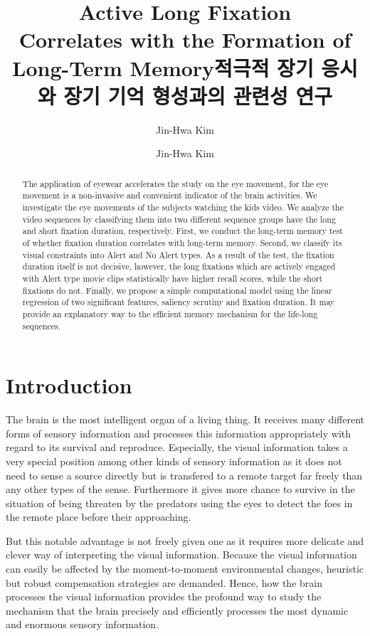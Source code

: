 \documentclass[oneside,master]{snueethesis}
\title{Active Long Fixation \\
Correlates with the Formation of \\
Long-Term Memory}
\title*{적극적 장기 응시와 장기 기억 형성과의 관련성 연구}
\author{Jin-Hwa Kim}
\author*{Jin-Hwa Kim} %
\begin{document}
\makefrontcover
\makefrontcover
\makeapproval

\cleardoublepage
{}

\begin{abstract}
The application of eyewear accelerates the study on the eye movement, for the eye movement is a non-invasive and convenient indicator of the brain activities. We investigate the eye movements of the subjects watching the kids video. We analyze the video sequences by classifying them into two different sequence groups have the long and short fixation duration, respectively. First, we conduct the long-term memory test of whether fixation duration correlates with long-term memory. Second, we classify its visual constraints into Alert and No Alert types. As a result of the test, the fixation duration itself is not decisive, however, the long fixations which are actively engaged with Alert type movie clips statistically have higher recall scores, while the short fixations do not. Finally, we propose a simple computational model using the linear regression of two significant features, saliency scrutiny and fixation duration. It may provide an explanatory way to the efficient memory mechanism for the life-long sequences.


\end{abstract}

\tableofcontents
\listoffigures
\listoftables

\cleardoublepage
{}

\chapter{Introduction}

The brain is the most intelligent organ of a living thing. It receives many different forms of sensory information and processes this information appropriately with regard to its survival and reproduce. Especially, the visual information takes a very special position among other kinds of sensory information as it does not need to sense a source directly but is transfered to a remote target far freely than any other types of the sense. Furthermore it gives more chance to survive in the situation of being threaten by the predators using the eyes to detect the foes in the remote place before their approaching. 

But this notable advantage is not freely given one as it requires more delicate and clever way of interpreting the visual information. Because the visual information can easily be affected by the moment-to-moment environmental changes, heuristic but robust compensation strategies are demanded. Hence, how the brain processes the visual information provides the profound way to study the mechanism that the brain precisely and efficiently processes the most dynamic and enormous sensory information.
\end{document}
